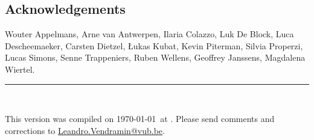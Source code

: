 \subsection*{Acknowledgements}

Wouter Appelmans, Arne van Antwerpen, Ilaria Colazzo, Luk De Block, 
Luca Descheemaeker, Carsten Dietzel, {\L}ukas Kubat, Kevin Piterman, 
Silvia Properzi, Lucas Simons, Senne Trappeniers, 
Ruben Wellens, Geoffrey Janssens, 
Magdalena Wiertel. 

\vfill
\noindent\rule{\textwidth}{0.4pt}\\[2pt]
{\footnotesize\indent This version was compiled on \today\ at \currenttime.
Please send comments and corrections to
\href{mailto:Leandro.Vendramin@vub.be}{Leandro.Vendramin@vub.be}.\par}



